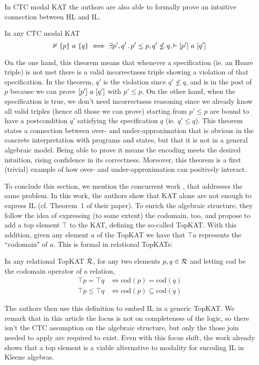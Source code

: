 In CTC modal KAT the authors are also able to formally prove an intuitive connection between HL and IL. 
\begin{theorem}
	In any CTC modal KAT
	\[
	\nvDash \{p\}~a~\{q\} \iff \exists p', q' \,.\, p' \le p, q' \nleq q, \vDash [p']~a~[q']
	\]
\end{theorem}
On the one hand, this theorem means that whenever a specification (ie. an Hoare triple) is not met there is a valid incorrectness triple showing a violation of that specification. In the theorem, $q'$ is the violation since $q' \nleq q$, and is in the post of $p$ because we can prove $[p']~a~[q']$ with $p' \le p$.
On the other hand, when the specification is true, we don't need incorrectness reasoning since we already know all valid triples (hence all those we can prove) starting from $p' \le p$ are bound to have a postcondition $q'$ satisfying the specification $q$ (ie. $q' \le q$).
This theorem states a connection between over- and under-approximation that is obvious in the concrete interpretation with programs and states, but that it is not in a general algebraic model. Being able to prove it means the encoding meets the desired intuition, rising confidence in its correctness. Moreover, this theorem is a first (trivial) example of how over- and under-approximation can positively interact.

To conclude this section, we mention the concurrent work \cite{ZAG22}, that addresses the same problem. In this work, the authors show that KAT alone are not enough to express IL (cf. Theorem~1 of their paper). To enrich the algebraic structure, they follow the idea of expressing (to some extent) the codomain, too, and propose to add a top element $\top$ to the KAT, defining the so-called TopKAT.
With this addition, given any element $a$ of the TopKAT we have that $\top a$ represents the ``codomain" of $a$. This is formal in relational TopKATs:
\begin{prop}
	In any relational TopKAT $\mathcal{R}$, for any two elements $p, q \in \mathcal{R}$ and letting $\text{cod}$ be the codomain operator of a relation,
	\begin{align*}
		\top p = \top q &\iff \text{cod}(p) = \text{cod}(q) \\
		\top p \le \top q &\iff \text{cod}(p) \subseteq \text{cod}(q)
	\end{align*}
\end{prop}
The authors then use this definition to embed IL in a generic TopKAT.
We remark that in this article the focus is not on completeness of the logic, so there isn't the CTC assumption on the algebraic structure, but only the those join needed to apply  are required to exist. Even with this focus shift, the work already shows that a top element is a viable alternative to modality for encoding IL in Kleene algebras.

